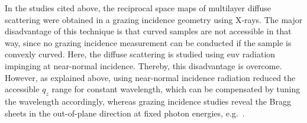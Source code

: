 In the studies cited above, the reciprocal space maps of multilayer diffuse scattering were obtained in a grazing incidence geometry using X-rays. The major disadvantage of this technique is that curved samples are not accessible in that way, since no grazing incidence measurement can be conducted if the sample is convexly curved. Here, the diffuse scattering is studied using \gls{euv} radiation impinging at near-normal incidence. Thereby, this disadvantage is overcome. However, as explained above, using near-normal incidence radiation reduced the accessible $q_z$ range for constant wavelength, which can be compensated by tuning the wavelength accordingly, whereas grazing incidence studies reveal the Bragg sheets in the out-of-plane direction at fixed photon energies, e.g.~\textcite{siffalovic_characterization_2009}.

